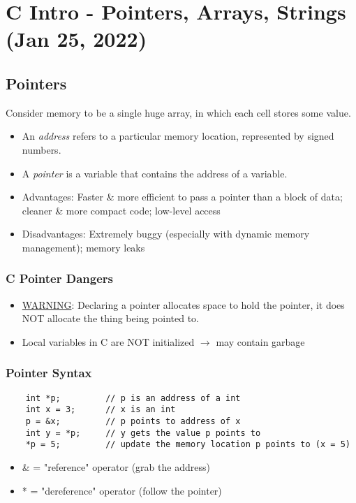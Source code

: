 \chapter{C Intro - Pointers, Arrays, Strings (Jan 25, 2022)}

\section{Pointers}
Consider memory to be a single huge array, in which each cell stores some value.

\begin{itemize}
    \item An \emph{address} refers to a particular memory location, represented by signed numbers.
    \item A \emph{pointer} is a variable that contains the address of a variable.
    \item Advantages: Faster \& more efficient to pass a pointer than a block of data; cleaner \& more compact code; low-level access
    \item Disadvantages: Extremely buggy (especially with dynamic memory management); memory leaks
\end{itemize}

\subsection{C Pointer Dangers}
\begin{itemize}
    \item \underline{WARNING}: Declaring a pointer allocates space to hold the pointer, it does NOT allocate the thing being pointed to.
    \item Local variables in C are NOT initialized \(\rightarrow\) may contain garbage
\end{itemize}

\subsection{Pointer Syntax}
\begin{verbatim}
    int *p;         // p is an address of a int
    int x = 3;      // x is an int
    p = &x;         // p points to address of x
    int y = *p;     // y gets the value p points to
    *p = 5;         // update the memory location p points to (x = 5)
\end{verbatim}
\begin{itemize}
    \item \& = "reference" operator (grab the address)
    \item * = "dereference" operator (follow the pointer)
\end{itemize}

